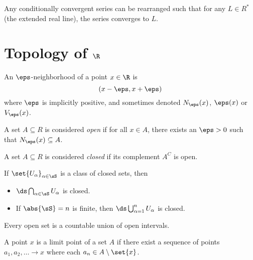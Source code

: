 \documentclass{article}
\begin{document}
\begin{thm}\label{thm:riemann-rearrangement}
  Any conditionally convergent series can be rearranged such that for any $L \in R^{*}$ (the extended real line),
  the series converges to $L$.
\end{thm}

\section{Topology of $\R$}

\begin{defn}\label{defn:epsilon-neighborhood}
  An $\eps$-neighborhood of a point $x \in \R$ is
  \[ (x - \eps, x + \eps) \]
  where $\eps$ is implicitly positive,
  and sometimes denoted $N_{\eps}(x)$, $\eps(x)$ or $V_{\eps}(x)$.
\end{defn}

\begin{defn}\label{defn:open-set}
  A set $A \subseteq R$ is considered \emph{open} if for all $x \in A$, there exists an $\eps > 0$ such that
  $N_{\eps}(x) \subseteq A$.
\end{defn}

\begin{defn}\label{defn:closed-set}
  A set $A \subseteq R$ is considered \emph{closed} if its complement $A^{C}$ is open.
\end{defn}

\begin{thm}\label{thm:union-closed-sets}
  If $\set{U_{\alpha}}_{\alpha \in \sS}$ is a class of closed sets, then
  \begin{itemize}
    \item $\ds\bigcap_{\alpha \in \sS}U_{\alpha}$ is closed.
    \item If $\abs{\sS} = n$ is finite, then $\ds\bigcup_{\alpha = 1}^{n}U_{\alpha}$ is closed.
  \end{itemize}
\end{thm}

\begin{prop}
  Every open set is a countable union of open intervals.
\end{prop}

\begin{defn}\label{defn:limit-point}
  A point $x$ is a limit point of a set $A$ if there exist a sequence of points $a_{1}, a_{2}, \ldots \to x$ where each $a_{n} \in A \setminus \set{x}$.
\end{defn}
\end{document}
